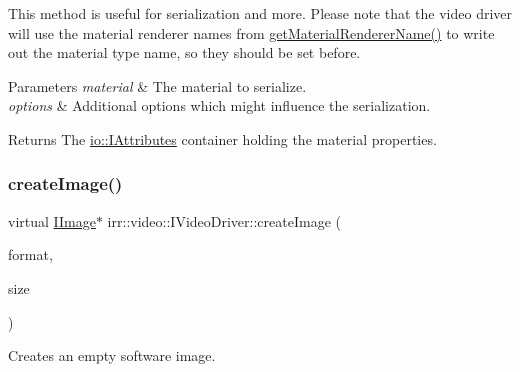 This method is useful for serialization and more. Please note that the video driver will use the material renderer names from \hyperlink{classirr_1_1video_1_1IVideoDriver_ac6f8c53abcd5a24d94c84185b0ef65e0}{get\+Material\+Renderer\+Name()} to write out the material type name, so they should be set before. 
\begin{DoxyParams}{Parameters}
{\em material} & The material to serialize. \\
\hline
{\em options} & Additional options which might influence the serialization. \\
\hline
\end{DoxyParams}
\begin{DoxyReturn}{Returns}
The \hyperlink{classirr_1_1io_1_1IAttributes}{io\+::\+I\+Attributes} container holding the material properties. 
\end{DoxyReturn}
\mbox{\label{classirr_1_1video_1_1IVideoDriver_aee1578fdd92118665755f31c0dd1dbb5}} 
\subsubsection{\texorpdfstring{create\+Image()}{createImage()}\hspace{0.1cm}{\footnotesize\ttfamily [1/4]}}
{\footnotesize\ttfamily virtual \hyperlink{classirr_1_1video_1_1IImage}{I\+Image}$\ast$ irr\+::video\+::\+I\+Video\+Driver\+::create\+Image (\begin{DoxyParamCaption}\item[{\hyperlink{namespaceirr_1_1video_a1d5e487888c32b1674a8f75116d829ed}{E\+C\+O\+L\+O\+R\+\_\+\+F\+O\+R\+M\+AT}}]{format,  }\item[{const \hyperlink{classirr_1_1core_1_1dimension2d}{core\+::dimension2d}$<$ \hyperlink{namespaceirr_a0416a53257075833e7002efd0a18e804}{u32} $>$ \&}]{size }\end{DoxyParamCaption})\hspace{0.3cm}{\ttfamily [pure virtual]}}



Creates an empty software image. 


